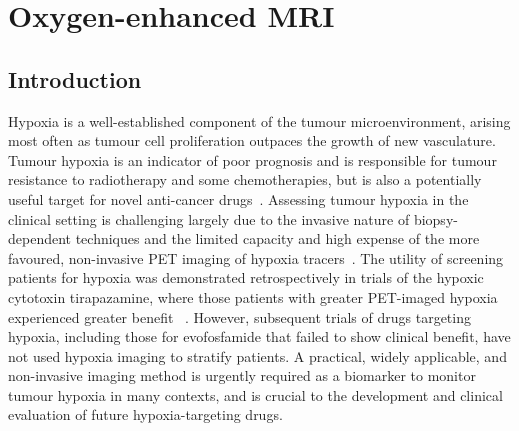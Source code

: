
\chapter{Oxygen-enhanced MRI}
\label{ch:oemri1}

\section{Introduction}

Hypoxia is a well-established component of the tumour microenvironment, arising most often as tumour cell proliferation outpaces the growth of new vasculature.
Tumour hypoxia is an indicator of poor prognosis and is responsible for tumour resistance to radiotherapy and some chemotherapies, but is also a potentially useful target for novel anti-cancer drugs~\cite{Wilson:2011jp}.
Assessing tumour hypoxia in the clinical setting is challenging largely due to the invasive nature of biopsy-dependent techniques and the limited capacity and high expense of the more favoured, non-invasive PET imaging of hypoxia tracers~\cite{Horsman:2012kw}.
The utility of screening patients for hypoxia was demonstrated retrospectively in trials of the hypoxic cytotoxin tirapazamine, where those patients with greater PET-imaged hypoxia experienced greater benefit ~\cite{Rischin:2006fz}.
However, subsequent trials of drugs targeting hypoxia, including those for evofosfamide that failed to show clinical benefit, have not used hypoxia imaging to stratify patients.
A practical, widely applicable, and non-invasive imaging method is urgently required as a biomarker to monitor tumour hypoxia in many contexts, and is crucial to the development and clinical evaluation of future hypoxia-targeting drugs.

